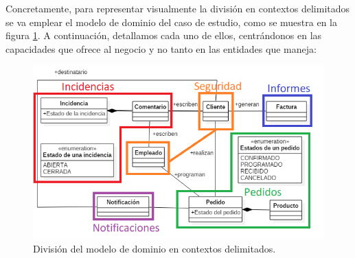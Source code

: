 \documentclass[11pt,spanish,listoffigures]{tfgetsinf}
\begin{document}
Concretamente, para representar visualmente la división en contextos delimitados se va emplear el modelo de dominio del caso de estudio, como se muestra en la figura \ref{fig:ShopBoundedContexts}. A continuación, detallamos cada uno de ellos, centrándonos en las capacidades que ofrece al negocio y no tanto en las entidades que maneja:

\begin{figure}[h]
\centering
\includegraphics[scale=1]{ShopBoundedContexts}
\caption{División del modelo de dominio en contextos delimitados.}
\label{fig:ShopBoundedContexts}
\end{figure}
\end{document}
